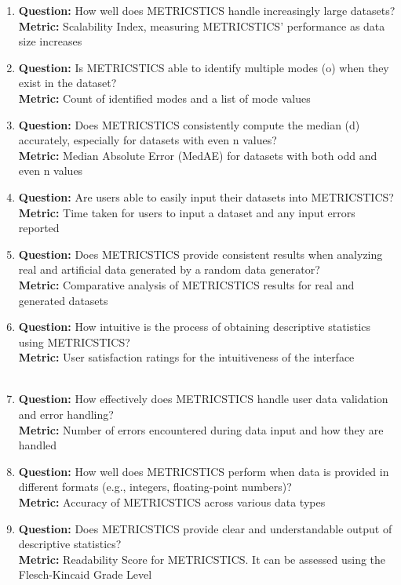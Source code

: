 \documentclass[letterpaper,12pt]{article}
\begin{document}
\begin{enumerate}
\item \textbf{Question:} How well does METRICSTICS handle increasingly large datasets?\\
\textbf{Metric:} Scalability Index, measuring METRICSTICS' performance as data size increases
\item \textbf{Question:} Is METRICSTICS able to identify multiple modes (o) when they exist in the dataset?\\
\textbf{Metric:} Count of identified modes and a list of mode values
\item \textbf{Question:} Does METRICSTICS consistently compute the median (d) accurately, especially for datasets with even n values?\\
\textbf{Metric:} Median Absolute Error (MedAE) for datasets with both odd and even n values
\item \textbf{Question:} Are users able to easily input their datasets into METRICSTICS?\\
\textbf{Metric:} Time taken for users to input a dataset and any input errors reported
\item \textbf{Question:} Does METRICSTICS provide consistent results when analyzing real and artificial data generated by a random data generator?\\
\textbf{Metric:} Comparative analysis of METRICSTICS results for real and generated datasets
\item \textbf{Question:} How intuitive is the process of obtaining descriptive statistics using METRICSTICS?\\
\textbf{Metric:} User satisfaction ratings for the intuitiveness of the interface\\
\\
\item \textbf{Question:} How effectively does METRICSTICS handle user data validation and error handling?\\
\textbf{Metric:} Number of errors encountered during data input and how they are handled
\item \textbf{Question:} How well does METRICSTICS perform when data is provided in different formats (e.g., integers, floating-point numbers)?\\
\textbf{Metric:} Accuracy of METRICSTICS across various data types
\item \textbf{Question:} Does METRICSTICS provide clear and understandable output of descriptive statistics?\\
\textbf{Metric:} Readability Score for METRICSTICS. It can be assessed using the Flesch-Kincaid Grade Level

\end{enumerate}
\end{document}
